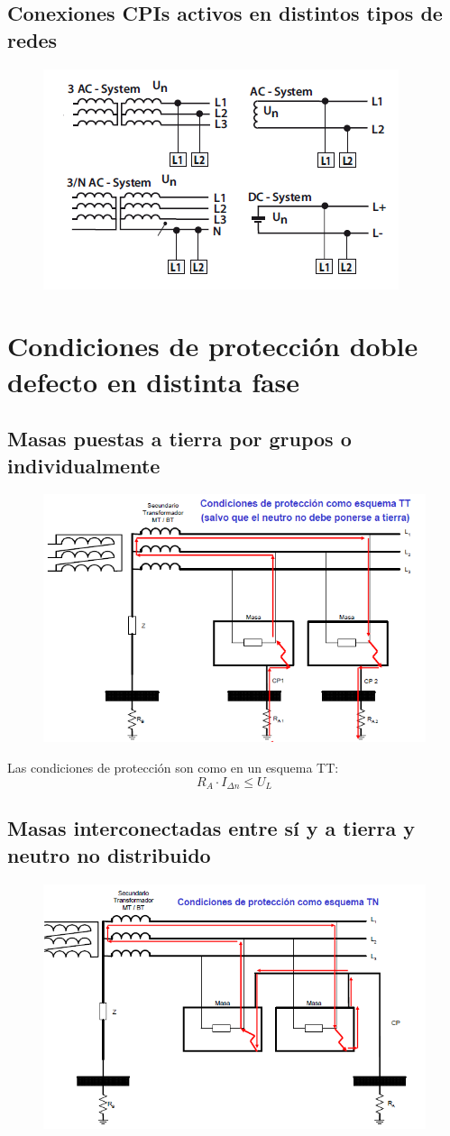 \subsection{Conexiones CPIs activos en distintos tipos de redes}
\begin{figure}[H]
	\centering
	\includegraphics[width=0.6\linewidth]{Images/38}
	\label{fig:38}
\end{figure}

\section{Condiciones de protección doble defecto en distinta fase}
\subsection{Masas puestas a tierra por grupos o individualmente}
\begin{figure}[H]
	\centering
	\includegraphics[width=0.5\linewidth]{Images/39}
	\label{fig:39}
\end{figure}

Las condiciones de protección son como en un esquema TT:
\begin{equation}
	R_A\cdot I_{\Delta n} \le U_L
\end{equation}
\subsection{Masas interconectadas entre sí y a tierra y neutro no distribuido}
\begin{figure}[H]
	\centering
	\includegraphics[width=0.5\linewidth]{Images/40}
	\label{fig:40}
\end{figure}

